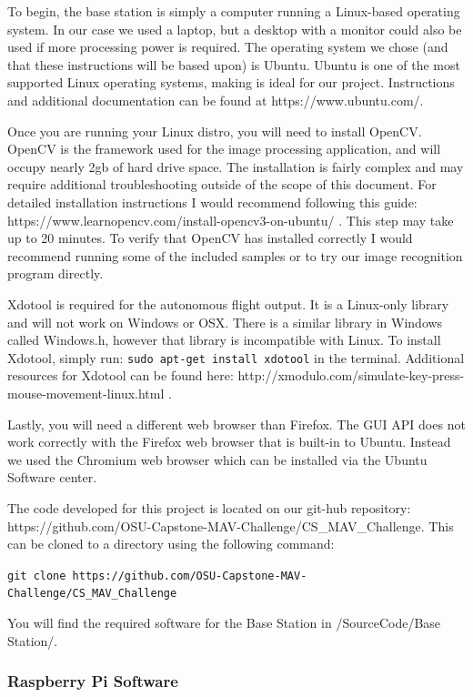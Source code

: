\documentclass[onecolumn, draftclsnofoot,10pt, compsoc]{IEEEtran}
\begin{document}
To begin, the base station is simply a computer running a Linux-based operating system. In our case we used a laptop, but a desktop with a monitor could also be used if more processing power is required. The operating system we chose (and that these instructions will be based upon) is Ubuntu. Ubuntu is one of the most supported Linux operating systems, making is ideal for our project. Instructions and additional documentation can be found at https://www.ubuntu.com/. 

Once you are running your Linux distro, you will need to install OpenCV. OpenCV is the framework used for the image processing application, and will occupy nearly 2gb of hard drive space. The installation is fairly complex and may require additional troubleshooting outside of the scope of this document. For detailed installation instructions I would recommend following this guide: https://www.learnopencv.com/install-opencv3-on-ubuntu/ . This step may take up to 20 minutes. To verify that OpenCV has installed correctly I would recommend running some of the included samples or to try our image recognition program directly. 

Xdotool is required for the autonomous flight output. It is a Linux-only library and will not work on Windows or OSX. There is a similar library in Windows called Windows.h, however that library is incompatible with Linux. To install Xdotool, simply run: \texttt{sudo apt-get install xdotool} in the terminal. Additional resources for Xdotool can be found here: http://xmodulo.com/simulate-key-press-mouse-movement-linux.html .

Lastly, you will need a different web browser than Firefox. The GUI API does not work correctly with the Firefox web browser that is built-in to Ubuntu. Instead we used the Chromium web browser which can be installed via the Ubuntu Software center. 

The code developed for this project is located on our git-hub repository: https://github.com/OSU-Capstone-MAV-Challenge/CS\_MAV\_Challenge. This can be cloned to a directory using the following command:
\newline

\texttt{git clone https://github.com/OSU-Capstone-MAV-Challenge/CS\_MAV\_Challenge} 

\vspace{0.2in}
You will find the required software for the Base Station in /SourceCode/Base Station/. 

\subsubsection{Raspberry Pi Software}
\end{document}
